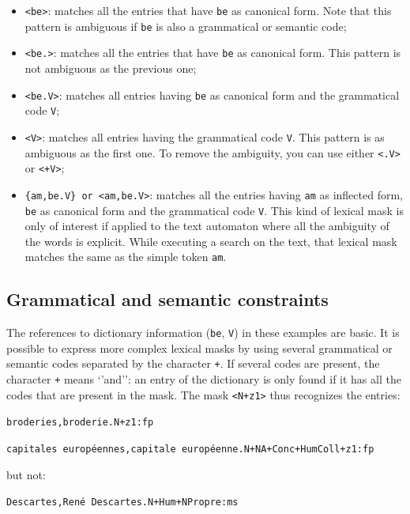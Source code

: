 \bigskip
\begin{itemize}
  \item \verb+<be>+: matches all the entries that have \verb+be+ as canonical
  form. Note that this pattern is ambiguous if \verb+be+ is also a grammatical
  or semantic code;
  \item \verb+<be.>+: matches all the entries that have \verb+be+ as canonical
  form. This pattern is not ambiguous as the previous one;
  \item \verb+<be.V>+: matches all entries having \verb+be+ as canonical form
  and the grammatical code \verb+V+;
  \item \verb+<V>+: matches all entries having the grammatical code \verb+V+.
  This pattern is as ambiguous as the first one. To remove the ambiguity, you
  can use either \verb+<.V>+ or \verb$<+V>$; 
  \item \verb+{am,be.V} or <am,be.V>+: matches all the entries having
  \verb+am+ as inflected form, \verb+be+ as canonical form and the
  grammatical code \verb+V+. This kind of lexical mask is only of interest if applied
  to the text automaton where all the ambiguity of the words is explicit.
   While executing a
  search on the text, that lexical mask matches the same as the simple token
  \verb+am+.
\end{itemize}

\subsection{Grammatical and semantic constraints}

The references to dictionary information (\verb+be+, \verb+V+) in these examples
are basic. It is possible to express more complex lexical masks by using
several grammatical or semantic codes separated by the character \verb$+$.
If several codes are present, the character \verb$+$ means `'and'':
 an entry of the dictionary is only found if it has all the codes that are
present in the mask. The mask \verb$<N+z1>$ thus recognizes the entries:

\bigskip
\noindent
\texttt{broderies,broderie.N+z1:fp}

\noindent
\texttt{capitales europ\'eennes,capitale europ\'eenne.N+NA+Conc+HumColl+z1:fp}

\bigskip
\noindent but not:

\bigskip
\noindent
\texttt{Descartes,Ren\'e Descartes.N+Hum+NPropre:ms}

